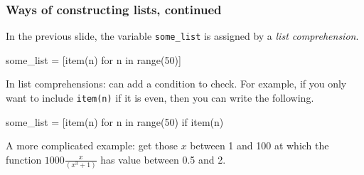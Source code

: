\documentclass{beamer}
\newenvironment{codeblock}
    {\hfill\begin{beamerboxesrounded}[lower=codecol, width=0.8\textwidth]
    \medskip

    }
    { 
    \end{beamerboxesrounded}\hfill
    }
\theoremstyle{example}
\newcommand{\ct}[1]{\lstinline[language=Python]!#1!}
\newcommand{\ttt}[1]{{\small\texttt{#1}}}
\begin{document}
\begin{frame}[fragile]
\frametitle{Ways of constructing lists, continued}
In the previous slide, the variable \ttt{some}\ct{_}\ttt{list} is assigned by a \emph{list comprehension}.

\begin{codeblock}

\begin{python}[numbers=none]
some_list = [item(n) for n in range(50)]
\end{python}

\end{codeblock}

In list comprehensions: can add a condition to check. For example, if you only want to include \ttt{item(n)} if it is even, then you can write the following.

\begin{codeblock}

\begin{python}[numbers=none]
some_list = [item(n) for n in range(50) if item(n) %
\end{python}

\end{codeblock}

\vfill
A more complicated example: get those $x$ between 1 and 100 at which the function $1000\frac{x}{(x^3+1)}$ has value between 0.5 and 2.

\begin{codeblock}

\begin{python}
\end{python}

\end{codeblock}

\end{frame}
\end{document}
